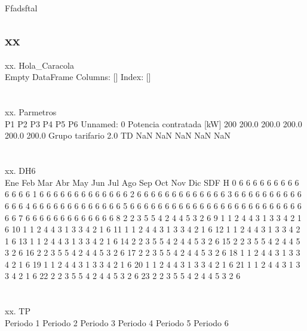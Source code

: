 \documentclass[a4paper,10pt,twocolumn]{article}
\begin{document}
\begin{Form}
\begin{table}[H]
{                        }
                        \caption{Ffadsftal}
                    \end{table}
                    
\newpage 
\subsection{xx}xx. Hola_Caracola \\ Empty DataFrame
Columns: []
Index: [] \\\\\\xx. Parmetros \\                               P1     P2     P3     P4     P5     P6
Unnamed: 0                                                         
Potencia contratada [kW]     200  200.0  200.0  200.0  200.0  200.0
Grupo tarifario           2.0 TD    NaN    NaN    NaN    NaN    NaN \\\\\\xx. DH6 \\     Ene  Feb  Mar  Abr  May  Jun  Jul  Ago  Sep  Oct  Nov  Dic  SDF
H                                                                  
0     6    6    6    6    6    6    6    6    6    6    6    6    6
1     6    6    6    6    6    6    6    6    6    6    6    6    6
2     6    6    6    6    6    6    6    6    6    6    6    6    6
3     6    6    6    6    6    6    6    6    6    6    6    6    6
4     6    6    6    6    6    6    6    6    6    6    6    6    6
5     6    6    6    6    6    6    6    6    6    6    6    6    6
6     6    6    6    6    6    6    6    6    6    6    6    6    6
7     6    6    6    6    6    6    6    6    6    6    6    6    6
8     2    2    3    5    5    4    2    4    4    5    3    2    6
9     1    1    2    4    4    3    1    3    3    4    2    1    6
10    1    1    2    4    4    3    1    3    3    4    2    1    6
11    1    1    2    4    4    3    1    3    3    4    2    1    6
12    1    1    2    4    4    3    1    3    3    4    2    1    6
13    1    1    2    4    4    3    1    3    3    4    2    1    6
14    2    2    3    5    5    4    2    4    4    5    3    2    6
15    2    2    3    5    5    4    2    4    4    5    3    2    6
16    2    2    3    5    5    4    2    4    4    5    3    2    6
17    2    2    3    5    5    4    2    4    4    5    3    2    6
18    1    1    2    4    4    3    1    3    3    4    2    1    6
19    1    1    2    4    4    3    1    3    3    4    2    1    6
20    1    1    2    4    4    3    1    3    3    4    2    1    6
21    1    1    2    4    4    3    1    3    3    4    2    1    6
22    2    2    3    5    5    4    2    4    4    5    3    2    6
23    2    2    3    5    5    4    2    4    4    5    3    2    6 \\\\\\xx. TP \\         Periodo 1  Periodo 2  Periodo 3  Periodo 4  Periodo 5 Periodo 6
                                                                       

\end{Form}
\end{document}
